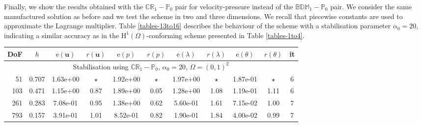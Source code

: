 \documentclass[onefignum,onetabnum,reqno,a4paper,final]{siamart250211}
\newcommand\bu{\boldsymbol{u}}
\newcommand\0{\mathbf{0}}
\newcommand\bH{\boldsymbol{\mathrm{H}}}
\numberwithin{figure}{section}
\numberwithin{table}{section}
\begin{document}
 
Finally, we show the results obtained with the $\mathbb{CR}_1-\mathbb{P}_0$ pair for velocity-pressure instead of the $\mathbb{BDM}_1-\mathbb{P}_0$ pair. We consider the same manufactured solution as before and we test the scheme in two and three dimensions. We recall that piecewise constants are used to approximate the Lagrange multiplier. Table \ref{tables-13to16} describes the behaviour of the scheme with a stabilisation parameter $\alpha_0=20$, indicating a similar  accuracy as in the $\bH^1(\Omega)$-conforming scheme presented in Table \ref{tables-1to4}.

\begin{table}[t!]
    \setlength{\tabcolsep}{3.5pt}
    \centering 
    {\small\begin{tabular}{|rcccccccccc|}
            \hline\hline
            DoF   &   $h$  & $\mathrm{e}(\bu)$  &   $r(\bu)$   &   $\mathrm{e}(p)$  &   $r(p)$  &  $\mathrm{e}(\lambda)$  &   $r(\lambda) $ &  $\mathrm{e}(\theta)$  &  $r(\theta)$  &   it \\
            \hline 
            \multicolumn{11}{|c|}{Stabilisation using $\mathbb{CR}_1-\mathbb{P}_0,\,\alpha_0=20$, $\Omega=(0,1)^2$} \\
            \hline
 51 & 0.707 & 1.63e+00 & $\star$ & 1.92e+00 & $\star$ & 1.97e+00 & $\star$ & 1.87e-01 & $\star$ &  6 \\
   103 & 0.471 & 1.15e+00 & 0.87 & 1.89e+00 & 0.05 & 1.28e+00 & 1.08 & 1.19e-01 & 1.11 &  6 \\
   261 & 0.283 & 7.08e-01 & 0.95 & 1.38e+00 & 0.62 & 5.60e-01 & 1.61 & 7.15e-02 & 1.00 &  7 \\
   793 & 0.157 & 3.91e-01 & 1.01 & 8.52e-01 & 0.82 & 1.90e-01 & 1.84 & 4.00e-02 & 0.99 &  7 \\

\end{tabular}}
\end{table}
\end{document}

